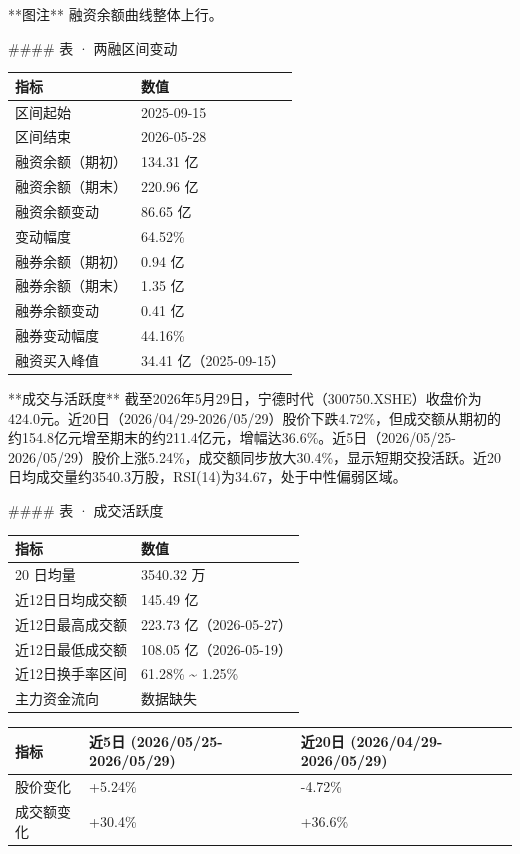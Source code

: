 \documentclass[12pt,a4paper]{article}
\begin{document}
**图注** 融资余额曲线整体上行。

\#\#\#\# 表 · 两融区间变动

\begin{table}[htbp]
\centering
\begin{tabular}{ll}
\toprule
指标 & 数值 \\
\midrule
区间起始 & 2025-09-15 \\
区间结束 & 2026-05-28 \\
融资余额（期初） & 134.31 亿 \\
融资余额（期末） & 220.96 亿 \\
融资余额变动 & 86.65 亿 \\
变动幅度 & 64.52\% \\
融券余额（期初） & 0.94 亿 \\
融券余额（期末） & 1.35 亿 \\
融券余额变动 & 0.41 亿 \\
融券变动幅度 & 44.16\% \\
融资买入峰值 & 34.41 亿（2025-09-15） \\
\bottomrule
\end{tabular}
\end{table}


**成交与活跃度**
截至2026年5月29日，宁德时代（300750.XSHE）收盘价为424.0元。近20日（2026/04/29-2026/05/29）股价下跌4.72\%，但成交额从期初的约154.8亿元增至期末的约211.4亿元，增幅达36.6\%。近5日（2026/05/25-2026/05/29）股价上涨5.24\%，成交额同步放大30.4\%，显示短期交投活跃。近20日均成交量约3540.3万股，RSI(14)为34.67，处于中性偏弱区域。

\#\#\#\# 表 · 成交活跃度

\begin{table}[htbp]
\centering
\begin{tabular}{ll}
\toprule
指标 & 数值 \\
\midrule
20 日均量 & 3540.32 万 \\
近12日日均成交额 & 145.49 亿 \\
近12日最高成交额 & 223.73 亿（2026-05-27） \\
近12日最低成交额 & 108.05 亿（2026-05-19） \\
近12日换手率区间 & 61.28\% \textasciitilde{} 1.25\% \\
主力资金流向 & 数据缺失 \\
\bottomrule
\end{tabular}
\end{table}


\begin{table}[htbp]
\centering
\begin{tabular}{lll}
\toprule
指标 & 近5日 (2026/05/25-2026/05/29) & 近20日 (2026/04/29-2026/05/29) \\
\midrule
股价变化 & +5.24\% & -4.72\% \\
成交额变化 & +30.4\% & +36.6\% \\
\bottomrule
\end{tabular}
\end{table}
\end{document}
